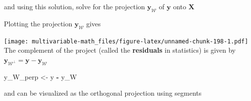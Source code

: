\documentclass[
]{book}
\newenvironment{Shaded}{\begin{snugshade}}{\end{snugshade}}
\newcommand{\CommentTok}[1]{\textcolor[rgb]{0.56,0.35,0.01}{\textit{#1}}}
\newcommand{\DataTypeTok}[1]{\textcolor[rgb]{0.13,0.29,0.53}{#1}}
\newcommand{\DecValTok}[1]{\textcolor[rgb]{0.00,0.00,0.81}{#1}}
\newcommand{\KeywordTok}[1]{\textcolor[rgb]{0.13,0.29,0.53}{\textbf{#1}}}
\newcommand{\NormalTok}[1]{#1}
\newcommand{\OperatorTok}[1]{\textcolor[rgb]{0.81,0.36,0.00}{\textbf{#1}}}
\newcommand{\StringTok}[1]{\textcolor[rgb]{0.31,0.60,0.02}{#1}}
\theoremstyle{definition}
\theoremstyle{definition}
\theoremstyle{definition}
\theoremstyle{definition}
\theoremstyle{remark}
\begin{document}
and using this solution, solve for the projection \(\mathbf{y}_{\mathcal{W}}\) of \(\mathbf{y}\) onto \(\mathbf{X}\)

\begin{Shaded}
\end{Shaded}

Plotting the projection \(\mathbf{y}_{\mathcal{W}}\) gives

\begin{Shaded}
\end{Shaded}

\texttt{[image: multivariable-math\_files/figure-latex/unnamed-chunk-198-1.pdf]}
The complement of the project (called the \textbf{residuals} in statistics) is given by \(\mathbf{y}_{\mathcal{W}^\perp} = \mathbf{y} - \mathbf{y}_{\mathcal{W}}\)

\begin{Shaded}
\begin{Highlighting}[]
\NormalTok{y_W_perp <-}\StringTok{ }\NormalTok{y }\OperatorTok{-}\StringTok{ }\NormalTok{y_W}
\end{Highlighting}
\end{Shaded}

and can be visualized as the orthogonal projection using segments
\end{document}
